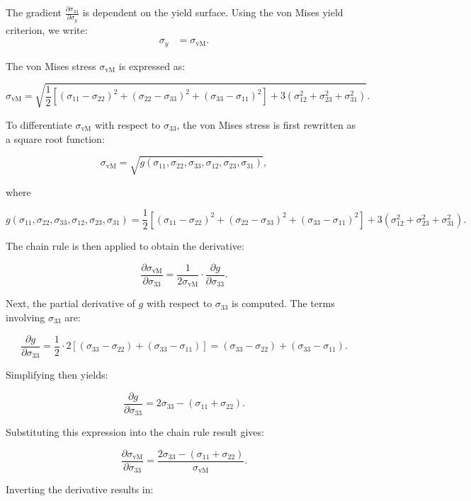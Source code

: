 The gradient $\frac{\partial \sigma_{33}}{\partial \sigma_y}$ is dependent on the yield surface. Using the von Mises yield criterion, we write:
\begin{align*}
    \sigma_y &= \sigma_{\text{vM}}
    .
\end{align*}

The von Mises stress \(\sigma_{\text{vM}}\) is expressed as:

\[
\sigma_{\text{vM}} = \sqrt{\frac{1}{2} \left[ (\sigma_{11} - \sigma_{22})^2 + (\sigma_{22} - \sigma_{33})^2 + (\sigma_{33} - \sigma_{11})^2 \right] + 3\left(\sigma_{12}^2 + \sigma_{23}^2 + \sigma_{31}^2\right)}.
\]

To differentiate \(\sigma_{\text{vM}}\) with respect to \(\sigma_{33}\), the von Mises stress is first rewritten as a square root function:

\[
\sigma_{\text{vM}} = \sqrt{g(\sigma_{11}, \sigma_{22}, \sigma_{33}, \sigma_{12}, \sigma_{23}, \sigma_{31})},
\]

where

\[
g(\sigma_{11}, \sigma_{22}, \sigma_{33}, \sigma_{12}, \sigma_{23}, \sigma_{31}) = \frac{1}{2} \left[ (\sigma_{11} - \sigma_{22})^2 + (\sigma_{22} - \sigma_{33})^2 + (\sigma_{33} - \sigma_{11})^2 \right] + 3\left(\sigma_{12}^2 + \sigma_{23}^2 + \sigma_{31}^2\right).
\]

The chain rule is then applied to obtain the derivative:

\[
\frac{\partial \sigma_{\text{vM}}}{\partial \sigma_{33}} = \frac{1}{2\sigma_{\text{vM}}} \cdot \frac{\partial g}{\partial \sigma_{33}}.
\]

Next, the partial derivative of \(g\) with respect to \(\sigma_{33}\) is computed. The terms involving \(\sigma_{33}\) are:

\[
\frac{\partial g}{\partial \sigma_{33}} = \frac{1}{2} \cdot 2 \left[(\sigma_{33} - \sigma_{22}) + (\sigma_{33} - \sigma_{11})\right] = (\sigma_{33} - \sigma_{22}) + (\sigma_{33} - \sigma_{11}).
\]

Simplifying then yields:

\[
\frac{\partial g}{\partial \sigma_{33}} = 2\sigma_{33} - (\sigma_{11} + \sigma_{22}).
\]

Substituting this expression into the chain rule result gives:

\[
\frac{\partial \sigma_{\text{vM}}}{\partial \sigma_{33}} = \frac{2\sigma_{33} - (\sigma_{11} + \sigma_{22})}{\sigma_{\text{vM}}}.
\]

Inverting the derivative results in:

